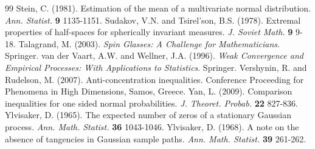 \documentclass[11pt,reqno]{amsart}
\theoremstyle{definition}
\begin{document}
\begin{thebibliography}{99}
Stein, C. (1981). Estimation of the mean of a multivariate normal distribution. {\em Ann. Statist.} \textbf{9} 1135-1151.
Sudakov, V.N. and Tsirel'son, B.S. (1978). Extremal properties of half-spaces for spherically invariant measures. {\em J. Soviet Math.} \textbf{9} 9-18.
Talagrand, M. (2003). {\em Spin Glasses: A Challenge for Mathematicians}.  Springer.
van der Vaart, A.W. and Wellner, J.A. (1996). {\em Weak Convergence and Empirical Processes: With Applications to Statistics}. Springer.
Vershynin, R. and Rudelson, M. (2007). Anti-concentration inequalities. Conference Proceeding for Phenomena in High Dimensions, Samos, Greece.
Yan, L. (2009). Comparison inequalities for one sided normal probabilities. {\em J. Theoret. Probab.} \textbf{22} 827-836.
Ylvisaker, D. (1965). The expected number of zeros of a stationary Gaussian process. {\em Ann. Math. Statist.} \textbf{36} 1043-1046.
Ylvisaker, D. (1968). A note on the absence of tangencies in Gaussian sample paths. {\em Ann. Math. Statist.} \textbf{39} 261-262.
\end{thebibliography}
\end{document}
